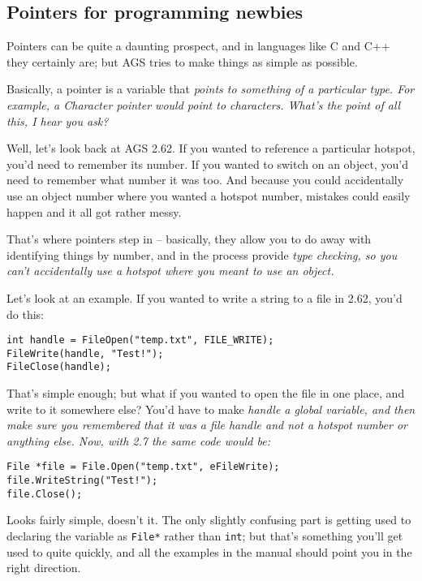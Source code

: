 \subsection{Pointers for programming newbies}\label{PointersForNewbies}%

Pointers can be quite a daunting prospect, and in languages like C and C++ they certainly
are; but AGS tries to make things as simple as possible.

Basically, a pointer is a variable that \it{points} to something of a particular type.
For example, a \it{Character} pointer would point to characters. What's the point of
all this, I hear you ask?

Well, let's look back at AGS 2.62. If you wanted to reference a particular hotspot,
you'd need to remember its number. If you wanted to switch on an object, you'd need to
remember what number it was too. And because you could accidentally use an object
number where you wanted a hotspot number, mistakes could easily happen and it all got
rather messy.

That's where pointers step in -- basically, they allow you to do away with identifying
things by number, and in the process provide \it{type checking}, so you can't accidentally
use a hotspot where you meant to use an object.

Let's look at an example. If you wanted to write a string to a file in 2.62, you'd do this:
\begin{verbatim}
int handle = FileOpen("temp.txt", FILE_WRITE);
FileWrite(handle, "Test!");
FileClose(handle);
\end{verbatim}
That's simple enough; but what if you wanted to open the file in one place, and write
to it somewhere else? You'd have to make \it{handle} a global variable, and then make
sure you remembered that it was a file handle and not a hotspot number or anything else.
Now, with 2.7 the same code would be:
\begin{verbatim}
File *file = File.Open("temp.txt", eFileWrite);
file.WriteString("Test!");
file.Close();
\end{verbatim}
Looks fairly simple, doesn't it. The only slightly confusing part is getting used
to declaring the variable as \verb$File*$ rather than \verb$int$; but that's something
you'll get used to quite quickly, and all the examples in the manual should point
you in the right direction.

